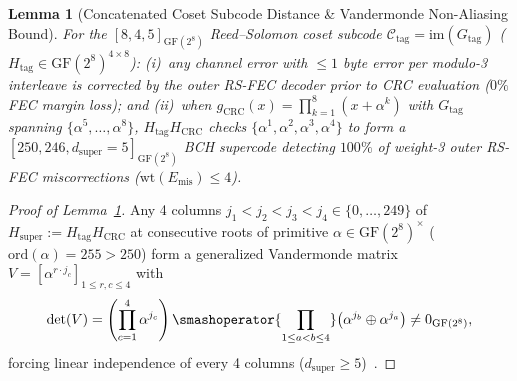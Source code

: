 \documentclass[11pt,letterpaper]{article}
\theoremstyle{spectralthm}
\newtheorem{lemma}[theorem]{Lemma}
\begin{document}
\begin{lemma}[Concatenated Coset Subcode Distance \& Vandermonde Non-Aliasing Bound]
\label{lem:bch}
For the $[8,4,5]_{\mathrm{GF}(2^8)}$ Reed--Solomon coset subcode $\mathcal{C}_{\mathrm{tag}} = \mathrm{im}(G_{\mathrm{tag}})$ ($H_{\mathrm{tag}} \in \mathrm{GF}(2^8)^{4 \times 8}$): (i)~any channel error with $\le 1$ byte error per modulo-3 interleave is corrected by the outer RS-FEC decoder prior to CRC evaluation ($0\%$ FEC margin loss); and (ii)~when $g_{\mathrm{CRC}}(x) = \prod_{k=1}^8 (x + \alpha^k)$ with $G_{\mathrm{tag}}$ spanning $\{\alpha^5,\ldots,\alpha^8\}$, $H_{\mathrm{tag}}H_{\mathrm{CRC}}$ checks $\{\alpha^1,\alpha^2,\alpha^3,\alpha^4\}$ to form a $[250, 246, d_{\mathrm{super}} = 5]_{\mathrm{GF}(2^8)}$ BCH supercode detecting $100\%$ of weight-3 outer RS-FEC miscorrections ($\mathrm{wt}(E_{\mathrm{mis}}) \le 4$).
\end{lemma}
\begin{proof}[Proof of Lemma~\ref{lem:bch}]
Any 4 columns $j_1 < j_2 < j_3 < j_4 \in \{0,\ldots,249\}$ of $H_{\mathrm{super}} := H_{\mathrm{tag}}H_{\mathrm{CRC}}$ at consecutive roots of primitive $\alpha \in \mathrm{GF}(2^8)^\times$ ($\mathrm{ord}(\alpha) = 255 > 250$) form a generalized Vandermonde matrix $V = [\alpha^{r \cdot j_c}]_{1 \le r, c \le 4}$ with
\begin{equation}
\label{eq:vandermonde_bch}
\det(V) = \left(\prod_{c=1}^4 \alpha^{j_c}\right) \smashoperator{\prod_{1 \le a < b \le 4}} \bigl(\alpha^{j_b} \oplus \alpha^{j_a}\bigr) \neq 0_{\mathrm{GF}(2^8)},
\end{equation}
forcing linear independence of every 4 columns ($d_{\mathrm{super}} \ge 5$)~\cite{macwilliams1977theorytheorytheorytheorytheorytheorytheorytheorytheorytheorytheorytheorytheorytheorytheorytheory}.
\end{proof}
\end{document}
